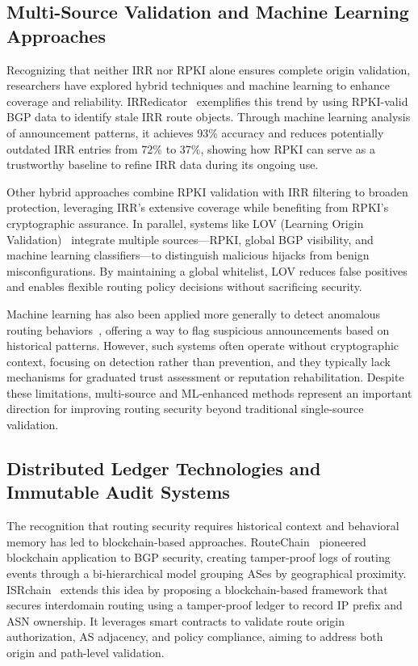 \subsection{Multi-Source Validation and Machine Learning Approaches}

Recognizing that neither IRR nor RPKI alone ensures complete origin validation, researchers have explored hybrid techniques and machine learning to enhance coverage and reliability. IRRedicator~\cite{KangLRKC24IRRedicator} exemplifies this trend by using RPKI-valid BGP data to identify stale IRR route objects. Through machine learning analysis of announcement patterns, it achieves 93\% accuracy and reduces potentially outdated IRR entries from 72\% to 37\%, showing how RPKI can serve as a trustworthy baseline to refine IRR data during its ongoing use.

Other hybrid approaches combine RPKI validation with IRR filtering to broaden protection, leveraging IRR's extensive coverage while benefiting from RPKI's cryptographic assurance. In parallel, systems like LOV (Learning Origin Validation)~\cite{schulmann2025lov} integrate multiple sources—RPKI, global BGP visibility, and machine learning classifiers—to distinguish malicious hijacks from benign misconfigurations. By maintaining a global whitelist, LOV reduces false positives and enables flexible routing policy decisions without sacrificing security.

Machine learning has also been applied more generally to detect anomalous routing behaviors~\cite{chen2024beam}, offering a way to flag suspicious announcements based on historical patterns. However, such systems often operate without cryptographic context, focusing on detection rather than prevention, and they typically lack mechanisms for graduated trust assessment or reputation rehabilitation. Despite these limitations, multi-source and ML-enhanced methods represent an important direction for improving routing security beyond traditional single-source validation.

\subsection{Distributed Ledger Technologies and Immutable Audit Systems}

The recognition that routing security requires historical context and behavioral memory has led to blockchain-based approaches. RouteChain~\cite{saad2022routechain} pioneered blockchain application to BGP security, creating tamper-proof logs of routing events through a bi-hierarchical model grouping ASes by geographical proximity. ISRchain~\cite{chen2020isrchain} extends this idea by proposing a blockchain-based framework that secures interdomain routing using a tamper-proof ledger to record IP prefix and ASN ownership. It leverages smart contracts to validate route origin authorization, AS adjacency, and policy compliance, aiming to address both origin and path-level validation.

